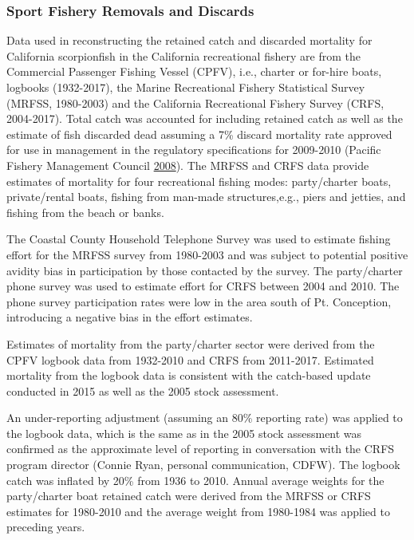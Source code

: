\documentclass[12pt,]{article}
\begin{document}
\subsubsection{Sport Fishery Removals and
Discards}\label{sport-fishery-removals-and-discards}

Data used in reconstructing the retained catch and discarded mortality
for California scorpionfish in the California recreational fishery are
from the Commercial Passenger Fishing Vessel (CPFV), i.e., charter or
for-hire boats, logbooks (1932-2017), the Marine Recreational Fishery
Statistical Survey (MRFSS, 1980-2003) and the California Recreational
Fishery Survey (CRFS, 2004-2017). Total catch was accounted for
including retained catch as well as the estimate of fish discarded dead
assuming a 7\% discard mortality rate approved for use in management in
the regulatory specifications for 2009-2010 (Pacific Fishery Management
Council \protect\hyperlink{ref-PFMC2008}{2008}). The MRFSS and CRFS data
provide estimates of mortality for four recreational fishing modes:
party/charter boats, private/rental boats, fishing from man-made
structures,e.g., piers and jetties, and fishing from the beach or banks.

The Coastal County Household Telephone Survey was used to estimate
fishing effort for the MRFSS survey from 1980-2003 and was subject to
potential positive avidity bias in participation by those contacted by
the survey. The party/charter phone survey was used to estimate effort
for CRFS between 2004 and 2010. The phone survey participation rates
were low in the area south of Pt. Conception, introducing a negative
bias in the effort estimates.

Estimates of mortality from the party/charter sector were derived from
the CPFV logbook data from 1932-2010 and CRFS from 2011-2017. Estimated
mortality from the logbook data is consistent with the catch-based
update conducted in 2015 as well as the 2005 stock assessment.

An under-reporting adjustment (assuming an 80\% reporting rate) was
applied to the logbook data, which is the same as in the 2005 stock
assessment was confirmed as the approximate level of reporting in
conversation with the CRFS program director (Connie Ryan, personal
communication, CDFW). The logbook catch was inflated by 20\% from 1936
to 2010. Annual average weights for the party/charter boat retained
catch were derived from the MRFSS or CRFS estimates for 1980-2010 and
the average weight from 1980-1984 was applied to preceding years.
\end{document}
